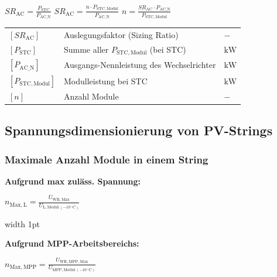 $
\boxed{SR_{\mathrm{AC}} = \frac{P_{\mathrm{STC}}}{P_{\mathrm{AC\_N}}}}
$
$
\boxed{SR_{\mathrm{AC}} = \frac{n \cdot P_{\mathrm{STC,Modul}}}{P_{\mathrm{AC,N}}}}
$
$
\boxed{
n = \frac{SR_{\mathrm{AC}} \cdot P_{\mathrm{AC\_N}}}{P_{\mathrm{STC,Modul}}}
}
$

\vspace{0.1cm}

\renewcommand{\arraystretch}{1.2}
\begin{tabular}{@{} l p{6.5cm} l @{}}
    $[SR_{\mathrm{AC}}]$   & Auslegungsfaktor (Sizing Ratio) \dotfill                        & $-$ \\
    $[P_{\mathrm{STC}}]$   & Summe aller $P_{\mathrm{STC,Modul}}$ (bei STC) \dotfill         & $\mathrm{kW}$ \\
    $[P_{\mathrm{AC\_N}}]$  & Ausgangs-Nennleistung des Wechselrichter \dotfill                   & $\mathrm{kW}$ \\
    $[P_{\mathrm{STC,Modul}}]$   & Modulleistung bei STC \dotfill         & $\mathrm{kW}$ \\
    $[n]$   & Anzahl Module \dotfill                        & $-$ \\
\end{tabular}


\vspace{0.1cm}





\subsection{Spannungsdimensionierung von PV-Strings}

\subsubsection{Maximale Anzahl Module in einem String}

\begin{minipage}[t]{0.48\columnwidth}
\textbf{Aufgrund max zuläss. Spannung:}

$
\boxed{
n_{\mathrm{Max,L}} = \frac{U_{\mathrm{WR,Max}}}{U_{\mathrm{L,Modul \, (-10 \, ^\circ\mathrm{C})}}}
}
$
\end{minipage}
\hfill
\vrule width 1pt
\hfill
\begin{minipage}[t]{0.48\columnwidth}
\textbf{Aufgrund  MPP-Arbeitsbereichs:}

$
\boxed{
n_{\mathrm{Max,MPP}} = \frac{U_{\mathrm{WR,MPP,Max}}}{U_{\mathrm{MPP,Modul \, (-10 \, ^\circ\mathrm{C})}}}
}
$
\end{minipage}

